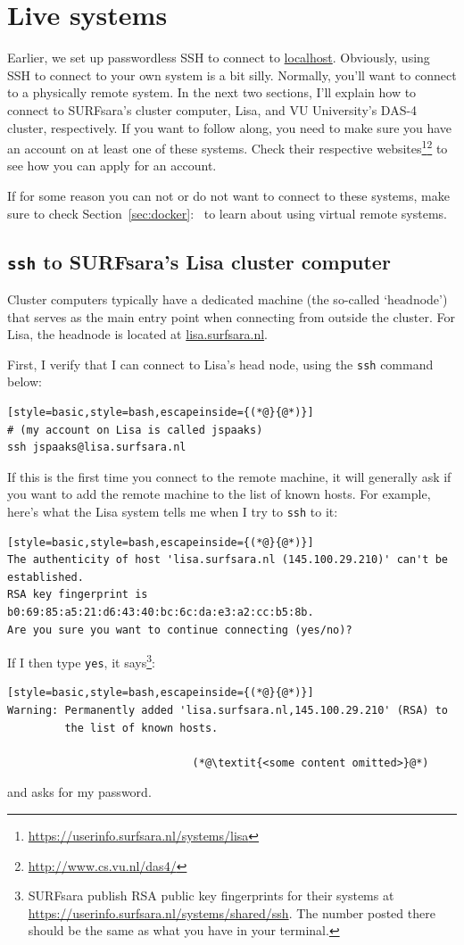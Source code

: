 \documentclass[12pt, a4paper, twoside, openany, titlepage]{book}
\begin{document}
\section{Live systems}
\label{sec:live-systems}

Earlier, we set up passwordless SSH to connect to \url{localhost}. Obviously, using SSH to connect to your own system is a bit silly. Normally, you'll want to connect to a physically remote system. In the next two sections, I'll explain how to connect to SURFsara's cluster computer, Lisa, and VU University's DAS-4 cluster, respectively. If you want to follow along, you need to make sure you have an account on at least one of these systems. Check their respective websites\footnote{\url{https://userinfo.surfsara.nl/systems/lisa}}\footnote{\url{http://www.cs.vu.nl/das4/}} to see how you can apply for an account.

If for some reason you can not or do not want to connect to these systems, make sure to check Section~\ref{sec:docker}:~\textit{} to learn about using virtual remote systems.

\subsection{\texttt{ssh} to SURFsara's Lisa cluster computer}

Cluster computers typically have a dedicated machine (the so-called `headnode') that serves as the main entry point when connecting from outside the cluster. For Lisa, the headnode is located at \url{lisa.surfsara.nl}.

First, I verify that I can connect to Lisa's head node, using the \texttt{ssh} command below:
\begin{lstlisting}[style=basic,style=bash,escapeinside={(*@}{@*)}]
# (my account on Lisa is called jspaaks)
ssh jspaaks@lisa.surfsara.nl
\end{lstlisting}

If this is the first time you connect to the remote machine, it will generally ask if you want to add the remote machine to the list of known hosts. For example, here's what the Lisa system tells me when I try to \texttt{ssh} to it:
\begin{lstlisting}[style=basic,style=bash,escapeinside={(*@}{@*)}]
The authenticity of host 'lisa.surfsara.nl (145.100.29.210)' can't be
established.
RSA key fingerprint is b0:69:85:a5:21:d6:43:40:bc:6c:da:e3:a2:cc:b5:8b.
Are you sure you want to continue connecting (yes/no)?
\end{lstlisting}
If I then type \texttt{yes}, it says\footnote{SURFsara publish RSA public key fingerprints for their systems at \url{https://userinfo.surfsara.nl/systems/shared/ssh}. The number posted there should be the same as what you have in your terminal.}:
\begin{lstlisting}[style=basic,style=bash,escapeinside={(*@}{@*)}]
Warning: Permanently added 'lisa.surfsara.nl,145.100.29.210' (RSA) to
         the list of known hosts.

                             (*@\textit{<some content omitted>}@*)
\end{lstlisting}
and asks for my password.
\end{document}
